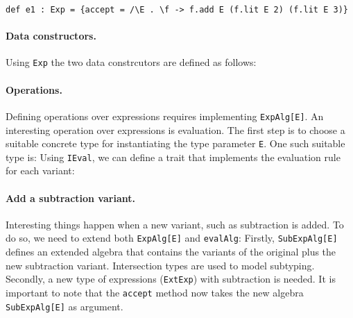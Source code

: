 
\begin{lstlisting}
def e1 : Exp = {accept = /\E . \f -> f.add E (f.lit E 2) (f.lit E 3)}
\end{lstlisting}

\paragraph{Data constructors.} Using \lstinline{Exp} the two data constrcutors
are defined as follows:

\paragraph{Operations.} Defining operations over expressions requires
implementing \lstinline{ExpAlg[E]}. An interesting operation over expressions is
evaluation. The first step is to choose a suitable concrete type for
instantiating the type parameter \lstinline{E}. One such suitable type is:
Using \lstinline{IEval}, we can define a trait that implements the evaluation
rule for each variant:


\paragraph{Add a subtraction variant.} Interesting things happen when a new
variant, such as subtraction is added. To do so, we need to extend both
\lstinline{ExpAlg[E]} and \lstinline{evalAlg}:
Firstly, \lstinline{SubExpAlg[E]} defines an extended algebra that contains the
variants of the original plus the new subtraction variant. Intersection types
are used to model subtyping. Secondly, a new type of expressions
(\lstinline{ExtExp}) with subtraction is needed. It is important to note that
the \lstinline{accept} method now takes the new algebra \lstinline{SubExpAlg[E]}
as argument.

